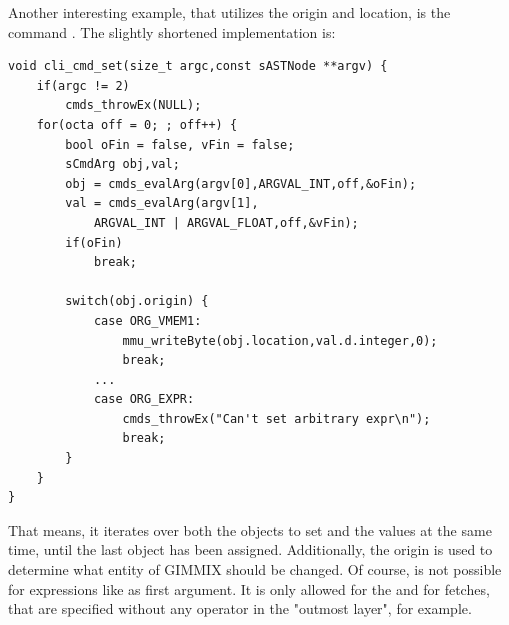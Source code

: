 Another interesting example, that utilizes the origin and location, is the command . The slightly shortened implementation is:
\begin{lstlisting}[language=GIMMIXC,caption={Implementation of command \gcmd{set}}]
void cli_cmd_set(size_t argc,const sASTNode **argv) {
	if(argc != 2)
		cmds_throwEx(NULL);
	for(octa off = 0; ; off++) {
		bool oFin = false, vFin = false;
		sCmdArg obj,val;
		obj = cmds_evalArg(argv[0],ARGVAL_INT,off,&oFin);
		val = cmds_evalArg(argv[1],
			ARGVAL_INT | ARGVAL_FLOAT,off,&vFin);
		if(oFin)
			break;

		switch(obj.origin) {
			case ORG_VMEM1:
				mmu_writeByte(obj.location,val.d.integer,0);
				break;
			...
			case ORG_EXPR:
				cmds_throwEx("Can't set arbitrary expr\n");
				break;
		}
	}
}
\end{lstlisting}
That means, it iterates over both the objects to set and the values at the same time, until the last object has been assigned. Additionally, the origin is used to determine what entity of GIMMIX should be changed. Of course,  is not possible for expressions like  as first argument. It is only allowed for the  and for fetches, that are specified without any operator in the "outmost layer", \ie {} for example.

